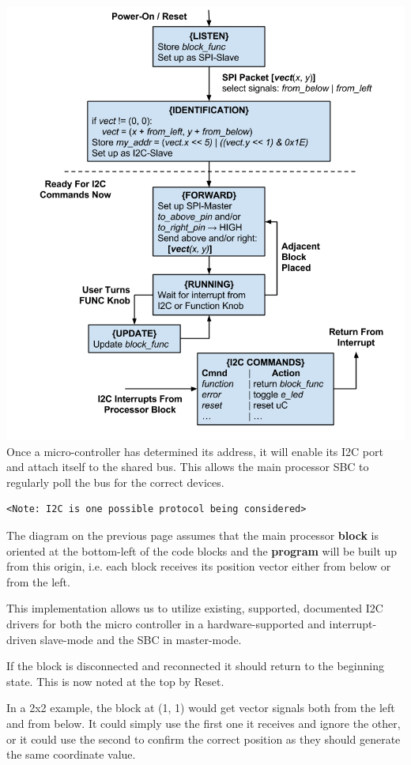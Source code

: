 \includegraphics[width=6in]{uC_State}
Once a micro-controller has determined its address, it will enable its I2C port and attach itself to the shared bus. This allows the main processor SBC to regularly poll the bus for the correct devices.
\begin{verbatim}
<Note: I2C is one possible protocol being considered>
\end{verbatim}
The diagram on the previous page assumes that the main processor \textbf{block} is oriented at the bottom-left of the code blocks and the \textbf{program} will be built up from this origin, i.e. each block receives its position vector either from below or from the left. 


This implementation allows us to utilize existing, supported, documented I2C drivers for both the micro controller in a hardware-supported and interrupt-driven slave-mode and the SBC in master-mode.

If the block is disconnected and reconnected it should return to the beginning state. This is now noted at the top by Reset.

In a 2x2 example, the block at (1, 1) would get vector signals both from the left and from below. It could simply use the first one it receives and ignore the other, or it could use the second to confirm the correct position as they should generate the same coordinate value.


